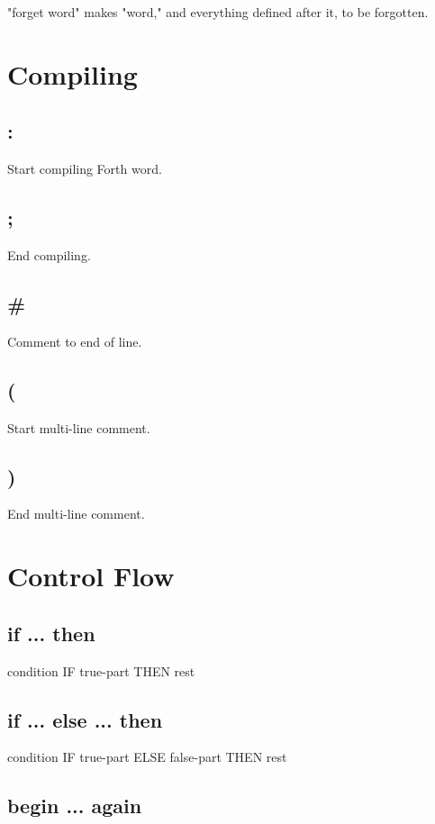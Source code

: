 "forget word" makes "word," and everything defined after it, to be forgotten.


\section{Compiling}

\subsection{:}

Start compiling Forth word.

\subsection{;}

End compiling.

\subsection{\#}

Comment to end of line.

\subsection{(}

Start multi-line comment.

\subsection{)}

End multi-line comment.


\section{Control Flow}

\subsection{if ... then}

condition IF true-part THEN rest

\subsection{if ... else ... then}

condition IF true-part ELSE false-part THEN rest

\subsection{begin ... again}

